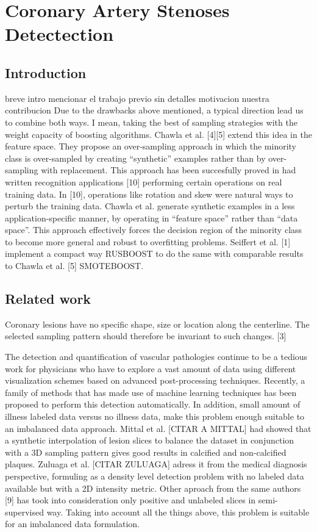 \chapter{Coronary Artery Stenoses Detectection}
%

\section{Introduction}

breve intro
mencionar el trabajo previo sin detalles
motivacion
nuestra contribucion
Due to the drawbacks above mentioned, a typical direction lead us to combine both ways. I mean, taking the best of sampling strategies with the weight capacity of boosting algorithms. Chawla et al. [4][5] extend this idea in the feature space. They propose an over-sampling approach in which the minority class is over-sampled by creating “synthetic” examples rather than by over-sampling with replacement. This approach has been succesfully proved in had written recognition applications [10] performing certain operations on real training data. In [10], operations like rotation and skew were natural ways to perturb the training data. Chawla et al. generate synthetic examples in a less application-specific manner, by operating in “feature space” rather than “data space”. This approach effectively forces the decision region of the minority class to become more general and robust to overfitting problems. Seiffert et al. [1] implement a compact way RUSBOOST to do the same with comparable results to Chawla et al. [5] SMOTEBOOST.

\section{Related work}

Coronary lesions have no specific shape, size or location along the centerline. The selected sampling pattern should therefore be invariant to such changes. [3]

The detection and quantification of vascular pathologies continue to be a tedious work for physicians who have to explore a vast amount of data using different visualization schemes based on advanced post-processing techniques. Recently, a family of methods that has made use of machine learning techniques has been proposed to perform this detection automatically. In addition, small amount of illness labeled data versus no illness data, make this problem enough suitable to an imbalanced data approach. Mittal et al. [CITAR A MITTAL] had showed that a synthetic interpolation of lesion slices to balance the dataset in conjunction with a 3D sampling pattern gives good results in calcified and non-calcified plaques. Zuluaga et al. [CITAR ZULUAGA] adress it from the medical diagnosis perspective, formuling as a density level detection problem with no labeled data available but with a 2D intensity metric. Other aproach from the same authors [9] has took into consideration only positive and unlabeled slices in semi-supervised way. Taking into account all the things above, this problem is suitable for an imbalanced data formulation.



